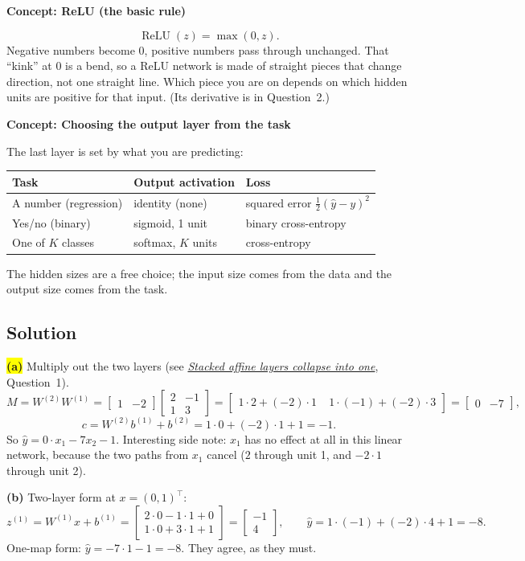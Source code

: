 \documentclass[12pt,a4paper]{article}
\newcommand{\concept}[2]{\par\medskip\phantomsection\label{#1}{\large\bfseries\color{blue!50!black} Concept: #2}\par}
\newcommand{\seeconcept}[3]{(see \hyperref[#1]{\textit{#2}}, Question~#3)}
\newcommand{\relu}{\operatorname{ReLU}}
\newcommand{\hlq}[1]{{\setlength{\fboxsep}{1.5pt}\colorbox{yellow}{#1}}}
\begin{document}
\concept{c:relu}{ReLU (the basic rule)}
\[
\relu(z)=\max(0,z).
\]
Negative numbers become 0, positive numbers pass through unchanged. That ``kink'' at 0 is a bend, so a ReLU network is made of straight pieces that change direction, not one straight line. Which piece you are on depends on which hidden units are positive for that input. (Its derivative is in Question~2.)

\concept{c:outputs}{Choosing the output layer from the task}
The last layer is set by what you are predicting:
\begin{center}
\begin{tabular}{@{}lll@{}}
\toprule
Task & Output activation & Loss \\
\midrule
A number (regression) & identity (none) & squared error $\tfrac12(\hat y-y)^2$ \\
Yes/no (binary) & sigmoid, 1 unit & binary cross-entropy \\
One of $K$ classes & softmax, $K$ units & cross-entropy \\
\bottomrule
\end{tabular}
\end{center}
The hidden sizes are a free choice; the input size comes from the data and the output size comes from the task.

\subsection*{Solution}
\hlq{\textbf{(a)}} Multiply out the two layers \seeconcept{c:collapse}{Stacked affine layers collapse into one}{1}.
\[
M = W^{(2)}W^{(1)} = \begin{bmatrix}1&-2\end{bmatrix}\begin{bmatrix}2&-1\\1&3\end{bmatrix}
= \begin{bmatrix}1\cdot2+(-2)\cdot1 & \;1\cdot(-1)+(-2)\cdot3\end{bmatrix} = \begin{bmatrix}0&-7\end{bmatrix},
\]
\[
c = W^{(2)}b^{(1)} + b^{(2)} = 1\cdot 0 + (-2)\cdot 1 + 1 = -1 .
\]
So $\hat y = 0\cdot x_1 - 7x_2 - 1$. Interesting side note: $x_1$ has no effect at all in this linear network, because the two paths from $x_1$ cancel ($2$ through unit 1, and $-2\cdot 1$ through unit 2).

\textbf{(b)} Two-layer form at $x=(0,1)^\top$:
\[
z^{(1)} = W^{(1)}x+b^{(1)} = \begin{bmatrix}2\cdot0-1\cdot1+0\\ 1\cdot0+3\cdot1+1\end{bmatrix} = \begin{bmatrix}-1\\4\end{bmatrix},\qquad
\hat y = 1\cdot(-1) + (-2)\cdot 4 + 1 = -8 .
\]
One-map form: $\hat y = -7\cdot 1 - 1 = -8$. They agree, as they must.
\end{document}
